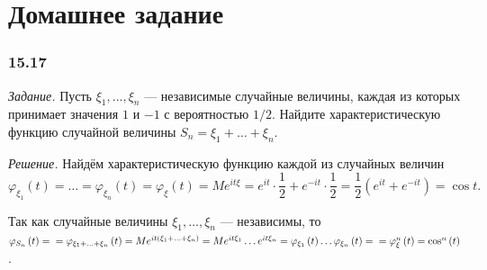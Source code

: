 \section*{Домашнее задание}

\subsubsection*{15.17}

\textit{Задание.} Пусть $ \xi_1, \dotsc, \xi_n$ --- независимые случайные величины, каждая из которых принимает значения $1$ и $- 1$ с вероятностью $1 / 2$.
Найдите характеристическую функцию случайной величины $S_n = \xi_1 + \dotsc + \xi_n$.

\textit{Решение.} Найдём характеристическую функцию каждой из случайных величин
$$ \varphi_{ \xi_1} \left( t \right) =
\dotsc =
\varphi_{ \xi_n} \left( t \right) =
\varphi_{ \xi } \left( t \right) =
Me^{it \xi } =
e^{it} \cdot \frac{1}{2} + e^{- it} \cdot \frac{1}{2} =
\frac{1}{2} \left( e^{it} + e^{- it} \right) =
\cos t.$$

Так как случайные величины $ \xi_1, \dotsc, \xi_n$ --- независимы,
то
$ \varphi_{S_n} \left( t \right) = \\
= \varphi_{ \xi_1 + \dotsc + \xi_n} \left( t \right) =
Me^{it \left( \xi_1 + \dotsc + \xi_n \right) } =
Me^{it \xi_1} \dotsc e^{it \xi_n} =
\varphi_{ \xi_1} \left( t \right) \dotsc \varphi_{ \xi_n} \left( t \right) = \\
= \varphi_{ \xi}^n \left( t \right) =
\cos^n \left( t \right) $.

